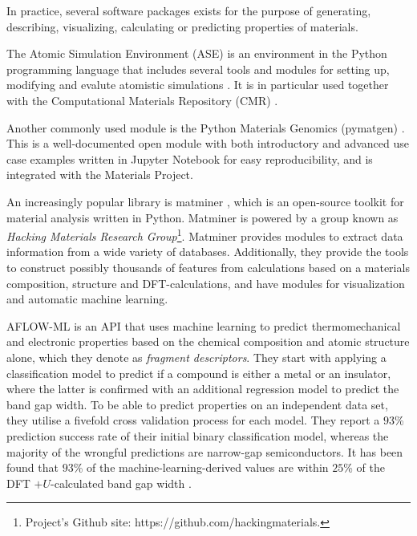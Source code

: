 In practice, several software packages exists for the purpose of generating, describing, visualizing, calculating or predicting properties of materials.

The Atomic Simulation Environment (ASE) is an environment in the Python programming language that includes several tools and modules for setting up, modifying and evalute atomistic simulations \cite{Larsen2017}. It is in particular used together with the Computational Materials Repository (CMR) \cite{Landis2012}.

Another commonly used module is the Python Materials Genomics (pymatgen) \cite{Ong2013}. This is a well-documented open module with both introductory and advanced use case examples written in Jupyter Notebook for easy reproducibility, and is integrated with the Materials Project. %

An increasingly popular library is matminer \cite{Ward2018}, which is an open-source toolkit for material analysis written in Python. Matminer is powered by a group known as \textit{Hacking Materials Research Group}\footnote{Project's Github site: https://github.com/hackingmaterials.}. Matminer provides modules to extract data information from a wide variety of databases. Additionally, they provide the tools to construct possibly thousands of features from calculations based on a materials composition, structure and DFT-calculations, and have modules for visualization and automatic machine learning.

AFLOW-ML \cite{Isayev2017} is an API that uses machine learning to predict thermomechanical and electronic properties based on the chemical composition and atomic structure alone, which they denote as \textit{fragment descriptors}. They start with applying a classification model to predict if a compound is either a metal or an insulator, where the latter is confirmed with an additional regression model to predict the band gap width. To be able to predict properties on an independent data set, they utilise a fivefold cross validation process for each model. They report a $93$\% prediction success rate of their initial binary classification model, whereas the majority of the wrongful predictions are narrow-gap semiconductors. It has been found that $93$\% of the machine-learning-derived values are within $25$\% of the DFT $+U$-calculated band gap width \cite{Ferrenti2020}.


